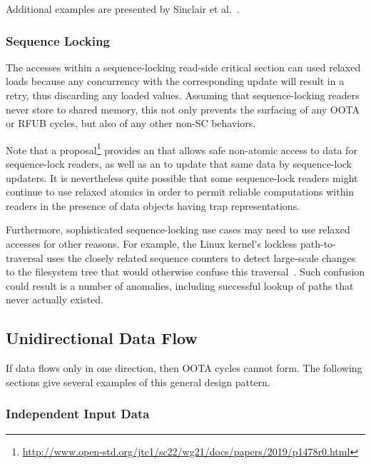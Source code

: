 \documentclass[10]{article}
\begin{document}
Additional examples are presented by
Sinclair et al.~\cite{Sinclair:2017:CAR:3079856.3080206}.

\subsubsection{Sequence Locking}
\label{sec:Sequence Locking}

The accesses within a sequence-locking read-side critical section
can used relaxed loads because any concurrency with the corresponding
update will result in a retry, thus discarding any loaded values.
Assuming that sequence-locking readers never store to shared memory,
this not only prevents the surfacing of any OOTA or RFUB cycles, but
also of any other non-SC behaviors.

Note that a proposal\footnote{
	\url{http://www.open-std.org/jtc1/sc22/wg21/docs/papers/2019/p1478r0.html}}
provides an  that allows safe
non-atomic access to data for sequence-lock readers, as well as an
 to update that same data by
sequence-lock updaters.
It is nevertheless quite possible that some sequence-lock readers
might continue to use relaxed atomics in order to permit reliable
computations within readers in the presence of data objects having
trap representations.

Furthermore, sophisticated sequence-locking use cases may need to
use relaxed accesses for other reasons.
For example, the Linux kernel's lockless path-to- traversal uses
the closely related sequence counters to detect large-scale changes
to the filesystem tree that would otherwise confuse this
traversal~\cite{NeilBrown2015PathnameLookup,NeilBrown2015RCUwalk}.
Such confusion could result is a number of anomalies, including successful
lookup of paths that never actually existed.

\subsection{Unidirectional Data Flow}
\label{sec:Unidirectional Data Flow}

If data flows only in one direction, then OOTA cycles cannot form.
The following sections give several examples of this general design
pattern.

\subsubsection{Independent Input Data}
\label{sec:Independent Input Data}
\end{document}
